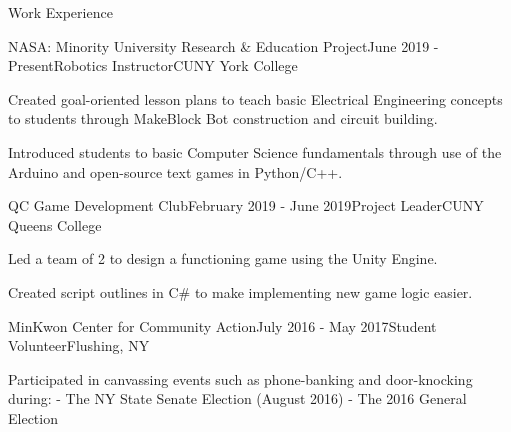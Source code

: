 \documentclass{resume} %
\begin{document}

\begin{rSection}{Work Experience}

\begin{rSubsection}{NASA: Minority University Research \& Education Project}{June 2019 - Present}{Robotics Instructor}{CUNY York College}
\item Created goal-oriented lesson plans to teach basic Electrical Engineering concepts to students through MakeBlock Bot construction and circuit building.
\item Introduced students to basic Computer Science fundamentals through use of the Arduino and open-source text games in Python/C++.
\end{rSubsection}

\begin{rSubsection}{QC Game Development Club}{February 2019 - June 2019}{Project Leader}{CUNY Queens College}
\item Led a team of 2 to design a functioning game using the Unity Engine.
\item Created script outlines in C\# to make implementing new game logic easier.
\end{rSubsection}

\begin{rSubsection}{MinKwon Center for Community Action}{July 2016 - May 2017}{Student Volunteer}{Flushing, NY}
\item Participated in canvassing events such as phone-banking and door-knocking during: \newline
- The NY State Senate Election (August 2016) \newline
- The 2016 General Election
\end{rSubsection}


\end{rSection}


\end{document}
